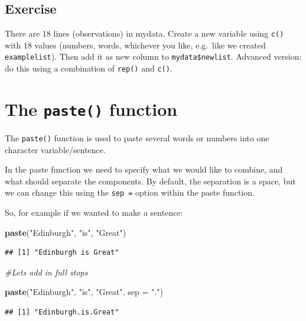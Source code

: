 \documentclass[]{book}
\makeatletter
\newenvironment{Shaded}{\begin{snugshade}}{\end{snugshade}}
\newcommand{\KeywordTok}[1]{\textcolor[rgb]{0.13,0.29,0.53}{\textbf{#1}}}
\newcommand{\DataTypeTok}[1]{\textcolor[rgb]{0.13,0.29,0.53}{#1}}
\newcommand{\StringTok}[1]{\textcolor[rgb]{0.31,0.60,0.02}{#1}}
\newcommand{\CommentTok}[1]{\textcolor[rgb]{0.56,0.35,0.01}{\textit{#1}}}
\newcommand{\NormalTok}[1]{#1}
\newenvironment{kframe}{%
\medskip{}
\setlength{\fboxsep}{.8em}
 \def\at@end@of@kframe{}%
 \ifinner\ifhmode%
  \def\at@end@of@kframe{\end{minipage}}%
  \begin{minipage}{\columnwidth}%
 \fi\fi%
 \def\FrameCommand##1{\hskip\@totalleftmargin \hskip-\fboxsep
 \colorbox{shadecolor}{##1}\hskip-\fboxsep
     \hskip-\linewidth \hskip-\@totalleftmargin \hskip\columnwidth}%
 \MakeFramed {\advance\hsize-\width
   \@totalleftmargin\z@ \linewidth\hsize
   \@setminipage}}%
 {\par\unskip\endMakeFramed%
 \at@end@of@kframe}
\renewenvironment{Shaded}{\begin{kframe}}{\end{kframe}}
\makeatother
\begin{document}
\subsection{Exercise}\label{exercise-11}

There are 18 lines (observations) in mydata. Create a new variable using
\texttt{c()} with 18 values (numbers, words, whichever you like,
e.g.~like we created \texttt{examplelist}). Then add it as new column to
\texttt{mydata\$newlist}. Advanced version: do this using a combination
of \texttt{rep()} and \texttt{c()}.

\newpage

\section{\texorpdfstring{The \texttt{paste()}
function}{The paste() function}}\label{the-paste-function}

The \texttt{paste()} function is used to paste several words or numbers
into one character variable/sentence.

In the paste function we need to specify what we would like to combine,
and what should separate the components. By default, the separation is a
space, but we can change this using the \texttt{sep\ =} option within
the paste function.

So, for example if we wanted to make a sentence:

\begin{Shaded}
\begin{Highlighting}[]
\KeywordTok{paste}\NormalTok{(}\StringTok{"Edinburgh"}\NormalTok{, }\StringTok{"is"}\NormalTok{, }\StringTok{"Great"}\NormalTok{)}
\end{Highlighting}
\end{Shaded}

\begin{verbatim}
## [1] "Edinburgh is Great"
\end{verbatim}

\begin{Shaded}
\begin{Highlighting}[]
\CommentTok{#Lets add in full stops}

\KeywordTok{paste}\NormalTok{(}\StringTok{"Edinburgh"}\NormalTok{, }\StringTok{"is"}\NormalTok{, }\StringTok{"Great"}\NormalTok{, }\DataTypeTok{sep =} \StringTok{"."}\NormalTok{)}
\end{Highlighting}
\end{Shaded}

\begin{verbatim}
## [1] "Edinburgh.is.Great"
\end{verbatim}
\end{document}
